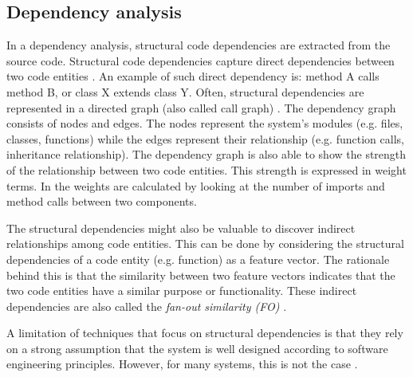 \subsection{Dependency analysis}
In a dependency analysis, structural code dependencies are extracted from the source code. Structural code dependencies capture direct dependencies between two code entities \cite{beck2011congruence}. An example of such direct dependency is: method A calls method B, or class X extends class Y. Often, structural dependencies are represented in a directed graph (also called call graph) \cite{alsarhan2020software}. The dependency graph consists of nodes and edges. The nodes represent the system's modules (e.g. files, classes, functions) while the edges represent their relationship (e.g. function calls, inheritance relationship). The dependency graph is also able to show the strength of the relationship between two code entities. This strength is expressed in weight terms. In \cite{matias2020determining} the weights are calculated by looking at the number of imports and method calls between two components.\par
The structural dependencies might also be valuable to discover indirect relationships among code entities. This can be done by considering the structural dependencies of a code entity (e.g. function) as a feature vector. The rationale behind this is that the similarity between two feature vectors indicates that the two code entities have a similar purpose or functionality. These indirect dependencies are also called the \textit{fan-out similarity (FO)} \cite{beck2011congruence}.\par
A limitation of techniques that focus on structural dependencies is that they rely on a strong assumption that the system is well designed according to software engineering principles. However, for many systems, this is not the case \cite{saeidi2015search}.

